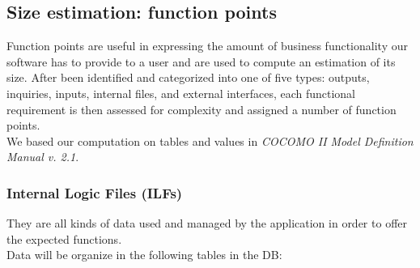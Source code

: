 \documentclass[english]{article}
\begin{document}
\begin{table}[H]
	\centering
	\caption{I'm a table. Are u sure?}
\end{table}

\subsection{Size estimation: function points}
Function points are useful in expressing the amount of business functionality our software has to provide to a user and are used to compute an estimation of its size.
After been identified and categorized into one of five types: outputs, inquiries, inputs, internal files, and external interfaces, each functional requirement is then assessed for complexity and assigned a number of function points.\\
We based our computation on tables and values in \emph{COCOMO II Model Definition Manual v. 2.1}.


\subsubsection{Internal Logic Files (ILFs)}

They are all kinds of data used and managed by the application in  order to offer the expected functions.\\
Data will be organize in the following tables in the DB:
\end{document}
